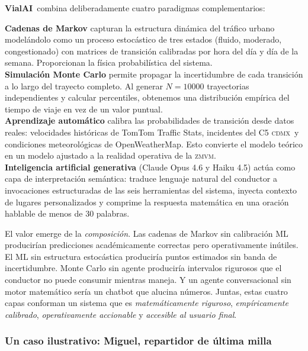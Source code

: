 \documentclass[11pt,a4paper]{article}
\newcommand{\VialAI}{\textbf{\textcolor{vialTeal}{Vial}\textcolor{vialAmber}{AI}}}
\newcommand{\ZMVM}{\textsc{zmvm}}
\newcommand{\CDMX}{\textsc{cdmx}}
\begin{document}
\VialAI\ combina deliberadamente cuatro paradigmas complementarios:

\begin{keybox}
\textbf{\textcolor{vialTeal}{Cadenas de Markov}} capturan la
estructura dinámica del tráfico urbano modelándolo como un proceso
estocástico de tres estados (fluido, moderado, congestionado) con
matrices de transición calibradas por hora del día y día de la
semana. Proporcionan la física probabilística del sistema.\\[0.3em]
\textbf{\textcolor{vialTeal}{Simulación Monte Carlo}} permite
propagar la incertidumbre de cada transición a lo largo del trayecto
completo. Al generar $N = \num{10000}$ trayectorias independientes
y calcular percentiles, obtenemos una distribución empírica del
tiempo de viaje en vez de un valor puntual.\\[0.3em]
\textbf{\textcolor{vialAmber}{Aprendizaje automático}} calibra las
probabilidades de transición desde datos reales: velocidades
históricas de TomTom Traffic Stats, incidentes del C5 \CDMX\ y
condiciones meteorológicas de OpenWeatherMap. Esto convierte el
modelo teórico en un modelo ajustado a la realidad operativa de la
\ZMVM.\\[0.3em]
\textbf{\textcolor{vialAmber}{Inteligencia artificial generativa}}
(Claude Opus 4.6 y Haiku 4.5) actúa como capa de interpretación
semántica: traduce lenguaje natural del conductor a invocaciones
estructuradas de las seis herramientas del sistema, inyecta contexto
de lugares personalizados y comprime la respuesta matemática en una
oración hablable de menos de \num{30} palabras.
\end{keybox}

El valor emerge de la \emph{composición}. Las cadenas de Markov sin
calibración ML producirían predicciones académicamente correctas
pero operativamente inútiles. El ML sin estructura estocástica
produciría puntos estimados sin banda de incertidumbre. Monte Carlo
sin agente produciría intervalos rigurosos que el conductor no puede
consumir mientras maneja. Y un agente conversacional sin motor
matemático sería un chatbot que alucina números. Juntas, estas
cuatro capas conforman un sistema que es \emph{matemáticamente
riguroso}, \emph{empíricamente calibrado}, \emph{operativamente
accionable} y \emph{accesible al usuario final}.

\subsubsection*{Un caso ilustrativo: Miguel, repartidor de última
milla}
\end{document}
